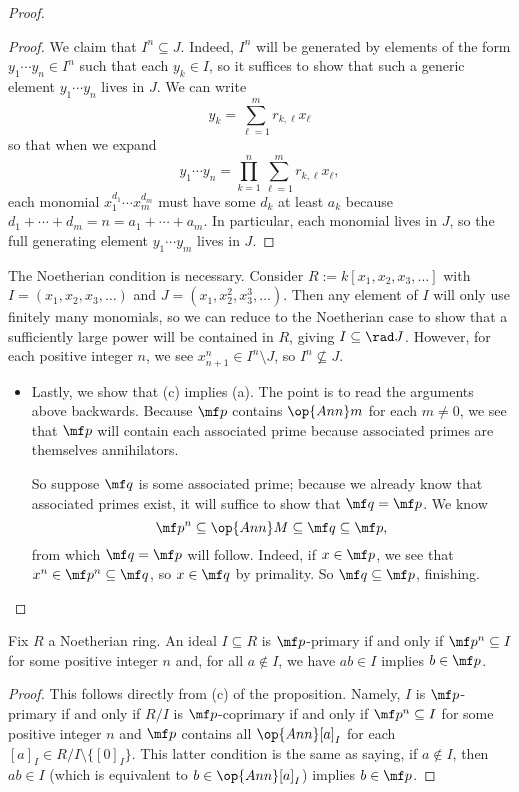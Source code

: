\begin{proof}
\begin{proof}
		We claim that $I^n\subseteq J$. Indeed, $I^n$ will be generated by elements of the form $y_1\cdots y_n\in I^n$ such that each $y_k\in I$, so it suffices to show that such a generic element $y_1\cdots y_n$ lives in $J$. We can write
		\[y_k=\sum_{\ell=1}^mr_{k,\ell}x_\ell\]
		so that when we expand
		\[y_1\cdots y_n=\prod_{k=1}^n\sum_{\ell=1}^mr_{k,\ell}x_\ell,\]
		each monomial $x_1^{d_1}\cdots x_m^{d_m}$ must have some $d_k$ at least $a_k$ because $d_1+\cdots+d_m=n=a_1+\cdots+a_m$. In particular, each monomial lives in $J$, so the full generating element $y_1\cdots y_m$ lives in $J$.
	\end{proof}
	\begin{remark}[Nir]
		The Noetherian condition is necessary. Consider $R:=k[x_1,x_2,x_3,\ldots]$ with $I=(x_1,x_2,x_3,\ldots)$ and $J=\left(x_1,x_2^2,x_3^3,\ldots\right)$. Then any element of $I$ will only use finitely many monomials, so we can reduce to the Noetherian case to show that a sufficiently large power will be contained in $R$, giving $I\subseteq\rad J$. However, for each positive integer $n$, we see $x_{n+1}^n\in I^n\setminus J$, so $I^n\not\subseteq J$.
	\end{remark}
	\begin{itemize}
		\item Lastly, we show that (c) implies (a). The point is to read the arguments above backwards. Because $\mf p$ contains $\op{Ann}m$ for each $m\ne0$, we see that $\mf p$ will contain each associated prime because associated primes are themselves annihilators.

		So suppose $\mf q$ is some associated prime; because we already know that associated primes exist, it will suffice to show that $\mf q=\mf p$. We know
		\[\mf p^n\subseteq\op{Ann}M\subseteq\mf q\subseteq\mf p,\]
		from which $\mf q=\mf p$ will follow. Indeed, if $x\in\mf p$, we see that $x^n\in\mf p^n\subseteq\mf q$, so $x\in\mf q$ by primality. So $\mf q\subseteq\mf p$, finishing.
		\qedhere
	\end{itemize}
\end{proof}
\begin{corollary}
	Fix $R$ a Noetherian ring. An ideal $I\subseteq R$ is $\mf p$-primary if and only if $\mf p^n\subseteq I$ for some positive integer $n$ and, for all $a\notin I$, we have $ab\in I$ implies $b\in\mf p$.
\end{corollary}
\begin{proof}
	This follows directly from (c) of the proposition. Namely, $I$ is $\mf p$-primary if and only if $R/I$ is $\mf p$-coprimary if and only if $\mf p^n\subseteq I$ for some positive integer $n$ and $\mf p$ contains all $\op{Ann}[a]_I$ for each $[a]_I\in R/I\setminus\{[0]_I\}$. This latter condition is the same as saying, if $a\notin I$, then $ab\in I$ (which is equivalent to $b\in\op{Ann}[a]_I$) implies $b\in\mf p$.
\end{proof}
